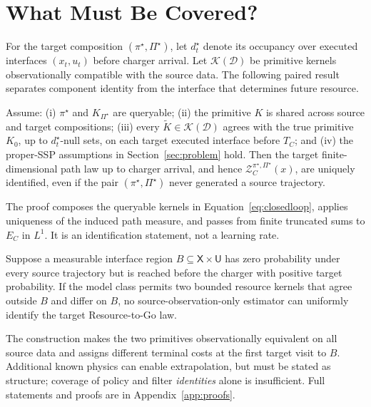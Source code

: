\section{What Must Be Covered?}
\label{sec:interface}

For the target composition \((\pi^\star,\Pi^\star)\), let \(d_t^\star\) denote its occupancy over executed interfaces \((x_t,u_t)\) before charger arrival. Let \(\mathcal K(\mathcal D)\) be primitive kernels observationally compatible with the source data. The following paired result separates component identity from the interface that determines future resource.

\begin{theorem}
\label{thm:identification}
Assume: (i) \(\pi^\star\) and \(K_{\Pi^\star}\) are queryable; (ii) the primitive \(K\) is shared across source and target compositions; (iii) every \(\widetilde K\in\mathcal K(\mathcal D)\) agrees with the true primitive \(K_0\), up to \(d_t^\star\)-null sets, on each target executed interface before \(T_C\); and (iv) the proper-SSP assumptions in Section~\ref{sec:problem} hold. Then the target finite-dimensional path law up to charger arrival, and hence \(\mathcal Z_C^{\pi^\star,\Pi^\star}(x)\), are uniquely identified, even if the pair \((\pi^\star,\Pi^\star)\) never generated a source trajectory.
\end{theorem}

The proof composes the queryable kernels in Equation~\eqref{eq:closedloop}, applies uniqueness of the induced path measure, and passes from finite truncated sums to \(E_C\) in \(L^1\). It is an identification statement, not a learning rate.

\begin{proposition}
\label{prop:nonident}
Suppose a measurable interface region \(B\subseteq\mathsf X\times\mathsf U\) has zero probability under every source trajectory but is reached before the charger with positive target probability. If the model class permits two bounded resource kernels that agree outside \(B\) and differ on \(B\), no source-observation-only estimator can uniformly identify the target Resource-to-Go law.
\end{proposition}

The construction makes the two primitives observationally equivalent on all source data and assigns different terminal costs at the first target visit to \(B\). Additional known physics can enable extrapolation, but must be stated as structure; coverage of policy and filter \emph{identities} alone is insufficient. Full statements and proofs are in Appendix~\ref{app:proofs}.
